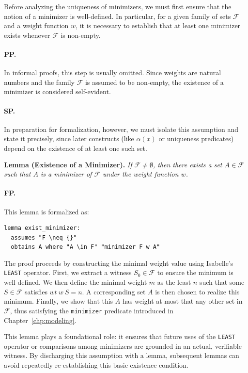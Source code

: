 Before analyzing the uniqueness of minimizers, we must first ensure that the notion of a minimizer is well-defined.
In particular, for a given family of sets $\mathcal{F}$ and a weight function $w$, it is necessary to establish that at least one minimizer exists whenever $\mathcal{F}$ is non-empty.

\paragraph{PP.}
In informal proofs, this step is usually omitted.
Since weights are natural numbers and the family $\mathcal{F}$ is assumed to be non-empty, the existence of a minimizer is considered self-evident.

\paragraph{SP.}
In preparation for formalization, however, we must isolate this assumption and state it precisely, since later constructs (like $\alpha(x)$ or uniqueness predicates) depend on the existence of at least one such set.

\noindent
\textbf{Lemma (Existence of a Minimizer).}
\emph{If $\mathcal{F} \neq \emptyset$, then there exists a set
$A \in \mathcal{F}$ such that $A$ is a minimizer of $\mathcal{F}$ under
the weight function $w$.}

\paragraph{FP.}
This lemma is formalized as:

\listingneedspace
\begin{lstlisting}[language=Isabelle, caption={Existence of Minimizer}]
lemma exist_minimizer:
  assumes "F \neq {}"
  obtains A where "A \in F" "minimizer F w A"
\end{lstlisting}

The proof proceeds by constructing the minimal weight value using Isabelle's \texttt{LEAST} operator.
First, we extract a witness $S_0 \in \mathcal{F}$ to ensure the minimum is well-defined.
We then define the minimal weight $m$ as the least $n$ such that some $S \in \mathcal{F}$ satisfies $wt\ w\ S = n$.
A corresponding set $A$ is then chosen to realize this minimum.
Finally, we show that this $A$ has weight at most that any other set in $\mathcal{F}$, thus satisfying the \texttt{minimizer} predicate introduced in Chapter~\ref{chp:modeling}.

This lemma plays a foundational role: it ensures that future uses of the \texttt{LEAST} operator or comparisons among minimizers are grounded in an actual, verifiable witness.
By discharging this assumption with a lemma, subsequent lemmas can avoid repeatedly re-establishing this basic existence condition.


